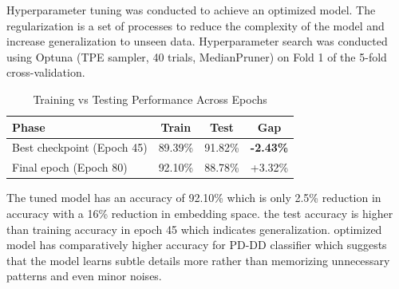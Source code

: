 \documentclass[conference]{IEEEtran}
\begin{document}
Hyperparameter tuning was conducted to achieve an optimized model.  The regularization is a set of processes to reduce the complexity of the model and increase generalization to unseen data.
Hyperparameter search was conducted using Optuna (TPE sampler, 40 trials, MedianPruner) on Fold 1 of the 5-fold cross-validation. 
\begin{table}[H]
\centering
\caption{Training vs Testing Performance Across Epochs}
\label{tab:train_test_gap}
\begin{tabular}{lccc}
\toprule
\textbf{Phase} & \textbf{Train} & \textbf{Test} & \textbf{Gap} \\
\midrule
Best checkpoint (Epoch 45) & 89.39\% & 91.82\% & \textbf{-2.43\%} \\
Final epoch (Epoch 80)     & 92.10\% & 88.78\% & +3.32\% \\
\bottomrule
\end{tabular}
\end{table}
The tuned model has an accuracy of 92.10\%  which is only 2.5\% reduction in accuracy with a 16\% reduction in embedding space. the test accuracy is higher than training accuracy in epoch 45 which indicates generalization. optimized model has comparatively higher accuracy for PD-DD classifier which suggests that the model learns subtle details more rather than memorizing unnecessary patterns and even minor noises.
\end{document}
